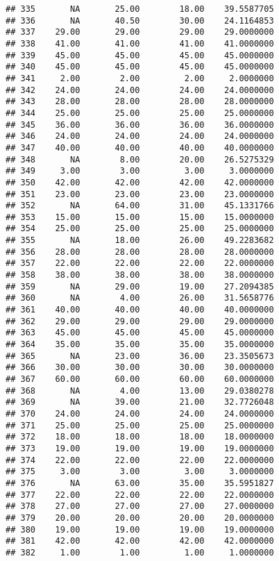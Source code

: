 \documentclass[
]{article}
\begin{document}
\begin{verbatim}
## 335       NA       25.00        18.00    39.5587705
## 336       NA       40.50        30.00    24.1164853
## 337    29.00       29.00        29.00    29.0000000
## 338    41.00       41.00        41.00    41.0000000
## 339    45.00       45.00        45.00    45.0000000
## 340    45.00       45.00        45.00    45.0000000
## 341     2.00        2.00         2.00     2.0000000
## 342    24.00       24.00        24.00    24.0000000
## 343    28.00       28.00        28.00    28.0000000
## 344    25.00       25.00        25.00    25.0000000
## 345    36.00       36.00        36.00    36.0000000
## 346    24.00       24.00        24.00    24.0000000
## 347    40.00       40.00        40.00    40.0000000
## 348       NA        8.00        20.00    26.5275329
## 349     3.00        3.00         3.00     3.0000000
## 350    42.00       42.00        42.00    42.0000000
## 351    23.00       23.00        23.00    23.0000000
## 352       NA       64.00        31.00    45.1331766
## 353    15.00       15.00        15.00    15.0000000
## 354    25.00       25.00        25.00    25.0000000
## 355       NA       18.00        26.00    49.2283682
## 356    28.00       28.00        28.00    28.0000000
## 357    22.00       22.00        22.00    22.0000000
## 358    38.00       38.00        38.00    38.0000000
## 359       NA       29.00        19.00    27.2094385
## 360       NA        4.00        26.00    31.5658776
## 361    40.00       40.00        40.00    40.0000000
## 362    29.00       29.00        29.00    29.0000000
## 363    45.00       45.00        45.00    45.0000000
## 364    35.00       35.00        35.00    35.0000000
## 365       NA       23.00        36.00    23.3505673
## 366    30.00       30.00        30.00    30.0000000
## 367    60.00       60.00        60.00    60.0000000
## 368       NA        4.00        13.00    29.0380278
## 369       NA       39.00        21.00    32.7726048
## 370    24.00       24.00        24.00    24.0000000
## 371    25.00       25.00        25.00    25.0000000
## 372    18.00       18.00        18.00    18.0000000
## 373    19.00       19.00        19.00    19.0000000
## 374    22.00       22.00        22.00    22.0000000
## 375     3.00        3.00         3.00     3.0000000
## 376       NA       63.00        35.00    35.5951827
## 377    22.00       22.00        22.00    22.0000000
## 378    27.00       27.00        27.00    27.0000000
## 379    20.00       20.00        20.00    20.0000000
## 380    19.00       19.00        19.00    19.0000000
## 381    42.00       42.00        42.00    42.0000000
## 382     1.00        1.00         1.00     1.0000000

\end{verbatim}
\end{document}
